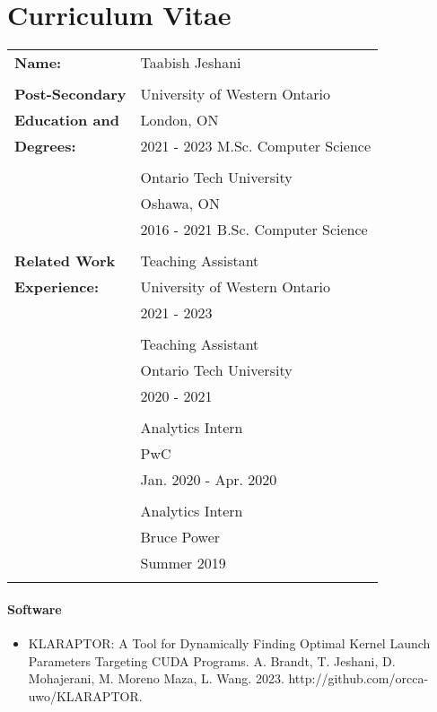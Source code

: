 \documentclass[12pt,twoside]{report}
\numberwithin{figure}{chapter}
\newcommand{\firstname}{Taabish}
\newcommand{\lastname}{Jeshani}
\begin{document}
\chapter*{Curriculum Vitae}
\begin{table}[H]
	\begin{tabular}{ll}
		\textbf{Name:} & \firstname{} \lastname\\\\
		\textbf{Post-Secondary}& University of Western Ontario\\
		\textbf{Education and}& London, ON\\
		\textbf{Degrees:} & 2021 - 2023 M.Sc. Computer Science\\\\
		 & Ontario Tech University\\
		 & Oshawa, ON\\
		 & 2016 - 2021 B.Sc. Computer Science\\\\
		\textbf{Related Work}& Teaching Assistant\\
		\textbf{Experience:}& University of Western Ontario\\
		& 2021 - 2023\\\\
		& Teaching Assistant\\
		& Ontario Tech University\\
		& 2020 - 2021\\\\
		& Analytics Intern\\
		& PwC \\
		& Jan. 2020 - Apr. 2020\\\\
		& Analytics Intern\\
		& Bruce Power\\
		& Summer 2019\\\\
	\end{tabular}
\end{table}
\subsubsection*{Software}
\begin{itemize}
	\item KLARAPTOR: A Tool for Dynamically Finding Optimal Kernel Launch Parameters Targeting CUDA Programs. A. Brandt, T. Jeshani, D. Mohajerani, M. Moreno Maza, L. Wang. 2023. http://github.com/orcca-uwo/KLARAPTOR.
\end{itemize}
\end{document}
